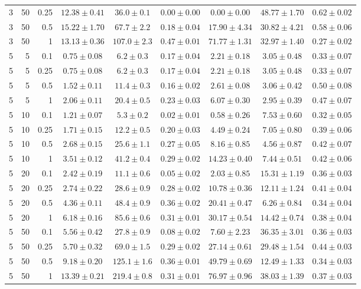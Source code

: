 \begin{table}[htbp]
\begin{tabular}{@{}rrrcccccc@{}}
3 & 50 & 0.25 & $12.38 \pm 0.41$ & $36.0 \pm 0.1$ & $0.00 \pm 0.00$ & $0.00 \pm 0.00$ & $48.77 \pm 1.70$ & $0.62 \pm 0.02$ \\
3 & 50 & 0.5 & $15.22 \pm 1.70$ & $67.7 \pm 2.2$ & $0.18 \pm 0.04$ & $17.90 \pm 4.34$ & $30.82 \pm 4.21$ & $0.58 \pm 0.06$ \\
3 & 50 & 1 & $13.13 \pm 0.36$ & $107.0 \pm 2.3$ & $0.47 \pm 0.01$ & $71.77 \pm 1.31$ & $32.97 \pm 1.40$ & $0.27 \pm 0.02$ \\
\midrule
5 & 5 & 0.1 & $0.75 \pm 0.08$ & $6.2 \pm 0.3$ & $0.17 \pm 0.04$ & $2.21 \pm 0.18$ & $3.05 \pm 0.48$ & $0.33 \pm 0.07$ \\
5 & 5 & 0.25 & $0.75 \pm 0.08$ & $6.2 \pm 0.3$ & $0.17 \pm 0.04$ & $2.21 \pm 0.18$ & $3.05 \pm 0.48$ & $0.33 \pm 0.07$ \\
5 & 5 & 0.5 & $1.52 \pm 0.11$ & $11.4 \pm 0.3$ & $0.16 \pm 0.02$ & $2.61 \pm 0.08$ & $3.06 \pm 0.42$ & $0.50 \pm 0.08$ \\
5 & 5 & 1 & $2.06 \pm 0.11$ & $20.4 \pm 0.5$ & $0.23 \pm 0.03$ & $6.07 \pm 0.30$ & $2.95 \pm 0.39$ & $0.47 \pm 0.07$ \\
5 & 10 & 0.1 & $1.21 \pm 0.07$ & $5.3 \pm 0.2$ & $0.02 \pm 0.01$ & $0.58 \pm 0.26$ & $7.53 \pm 0.60$ & $0.32 \pm 0.05$ \\
5 & 10 & 0.25 & $1.71 \pm 0.15$ & $12.2 \pm 0.5$ & $0.20 \pm 0.03$ & $4.49 \pm 0.24$ & $7.05 \pm 0.80$ & $0.39 \pm 0.06$ \\
5 & 10 & 0.5 & $2.68 \pm 0.15$ & $25.6 \pm 1.1$ & $0.27 \pm 0.05$ & $8.16 \pm 0.85$ & $4.56 \pm 0.87$ & $0.42 \pm 0.07$ \\
5 & 10 & 1 & $3.51 \pm 0.12$ & $41.2 \pm 0.4$ & $0.29 \pm 0.02$ & $14.23 \pm 0.40$ & $7.44 \pm 0.51$ & $0.42 \pm 0.06$ \\
5 & 20 & 0.1 & $2.42 \pm 0.19$ & $11.1 \pm 0.6$ & $0.05 \pm 0.02$ & $2.03 \pm 0.85$ & $15.31 \pm 1.19$ & $0.36 \pm 0.03$ \\
5 & 20 & 0.25 & $2.74 \pm 0.22$ & $28.6 \pm 0.9$ & $0.28 \pm 0.02$ & $10.78 \pm 0.36$ & $12.11 \pm 1.24$ & $0.41 \pm 0.04$ \\
5 & 20 & 0.5 & $4.36 \pm 0.11$ & $48.4 \pm 0.9$ & $0.36 \pm 0.02$ & $20.41 \pm 0.47$ & $6.26 \pm 0.84$ & $0.34 \pm 0.04$ \\
5 & 20 & 1 & $6.18 \pm 0.16$ & $85.6 \pm 0.6$ & $0.31 \pm 0.01$ & $30.17 \pm 0.54$ & $14.42 \pm 0.74$ & $0.38 \pm 0.04$ \\
5 & 50 & 0.1 & $5.56 \pm 0.42$ & $27.8 \pm 0.9$ & $0.08 \pm 0.02$ & $7.60 \pm 2.23$ & $36.35 \pm 3.01$ & $0.36 \pm 0.03$ \\
5 & 50 & 0.25 & $5.70 \pm 0.32$ & $69.0 \pm 1.5$ & $0.29 \pm 0.02$ & $27.14 \pm 0.61$ & $29.48 \pm 1.54$ & $0.44 \pm 0.03$ \\
5 & 50 & 0.5 & $9.18 \pm 0.20$ & $125.1 \pm 1.6$ & $0.36 \pm 0.01$ & $49.79 \pm 0.69$ & $12.49 \pm 1.33$ & $0.34 \pm 0.03$ \\
5 & 50 & 1 & $13.39 \pm 0.21$ & $219.4 \pm 0.8$ & $0.31 \pm 0.01$ & $76.97 \pm 0.96$ & $38.03 \pm 1.39$ & $0.37 \pm 0.03$ \\
\bottomrule
\end{tabular}
\end{table}
